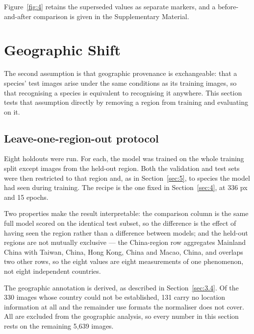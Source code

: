 \documentclass[preprint,12pt,authoryear]{elsarticle}
\begin{document}
Figure~\ref{fig:4} retains the superseded values as separate markers, and a before-and-after comparison is given in the Supplementary Material.

\setcounter{section}{5}

\section{Geographic Shift}\label{sec:6}

The second assumption is that geographic provenance is exchangeable: that a species' test images arise under the same conditions as its training images, so that recognising a species is equivalent to recognising it anywhere. This section tests that assumption directly by removing a region from training and evaluating on it.

\setcounter{section}{6}

\setcounter{subsection}{0}

\subsection{Leave-one-region-out protocol}\label{sec:6.1}

Eight holdouts were run. For each, the model was trained on the whole training split except images from the held-out region. Both the validation and test sets were then restricted to that region and, as in Section~\ref{sec:5}, to species the model had seen during training. The recipe is the one fixed in Section~\ref{sec:4}, at 336 px and 15 epochs.

Two properties make the result interpretable: the comparison column is the same full model scored on the identical test subset, so the difference is the effect of having seen the region rather than a difference between models; and the held-out regions are not mutually exclusive --- the China-region row aggregates Mainland China with Taiwan, China, Hong Kong, China and Macao, China, and overlaps two other rows, so the eight values are eight measurements of one phenomenon, not eight independent countries.

The geographic annotation is derived, as described in Section~\ref{sec:3.4}. Of the 330 images whose country could not be established, 131 carry no location information at all and the remainder use formats the normaliser does not cover. All are excluded from the geographic analysis, so every number in this section rests on the remaining 5,639 images.

\setcounter{section}{6}
\end{document}
